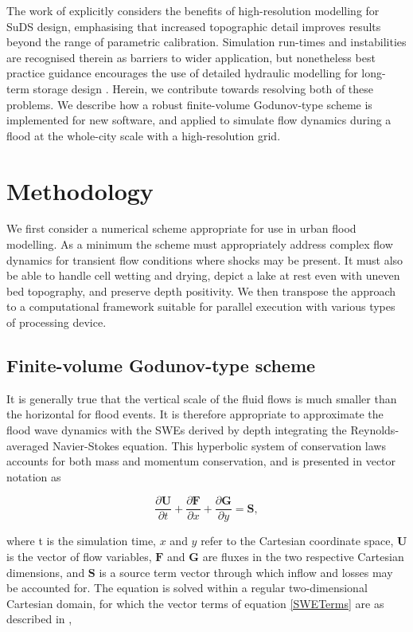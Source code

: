 \documentclass[11pt,english,a4paper]{article}
\begin{document}
The work of \citet{Ozdemir2013} explicitly considers the benefits of high-resolution modelling for SuDS design, emphasising that increased topographic detail improves results beyond the range of parametric calibration. Simulation run-times and instabilities are recognised therein as barriers to wider application, but nonetheless best practice guidance encourages the use of detailed hydraulic modelling for long-term storage design \citep{Woods-Ballard2007}. Herein, we contribute towards resolving both of these problems. We describe how a robust finite-volume Godunov-type scheme is implemented for new software, and applied to simulate flow dynamics during a flood at the whole-city scale with a high-resolution grid. 

\section{Methodology}

We first consider a numerical scheme appropriate for use in urban flood modelling. As a minimum the scheme must appropriately address complex flow dynamics for transient flow conditions where shocks may be present. It must also be able to handle cell wetting and drying, depict a lake at rest even with uneven bed topography, and preserve depth positivity. We then transpose the approach to a computational framework suitable for parallel execution with various types of processing device. 

\subsection{Finite-volume Godunov-type scheme}

It is generally true that the vertical scale of the fluid flows is much smaller than the horizontal for flood events. It is therefore appropriate to approximate the flood wave dynamics with the SWEs derived by depth integrating the Reynolds-averaged Navier-Stokes equation. This hyperbolic system of conservation laws accounts for both mass and momentum conservation, and is presented in vector notation as

\begin{equation}
	\label{SWE}
	\frac{\partial\textbf{U}}{\partial t} +
	\frac{\partial\textbf{F}}{\partial x} +
	\frac{\partial\textbf{G}}{\partial y} =
	\textbf{S} ,
\end{equation}

where t is the simulation time, \(x\) and \(y\) refer to the Cartesian coordinate space, \(\textbf{U}\) is the vector of flow variables, \(\textbf{F}\) and \(\textbf{G}\) are fluxes in the two respective Cartesian dimensions, and \(\textbf{S}\) is a source term vector through which inflow and losses may be accounted for. The equation is solved within a regular two-dimensional Cartesian domain, for which the vector terms of equation \eqref{SWETerms} are as described in \citet{Liang2009b}, 
 
\end{document}
